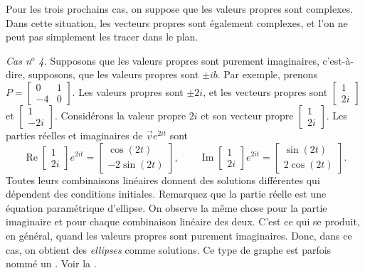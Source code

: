\medskip

\pagebreak[0]
Pour les trois prochains cas, on suppose que les valeurs propres sont complexes. Dans cette situation, les vecteurs propres sont également complexes, et l'on ne peut pas simplement les tracer dans le plan.

\medskip

\pagebreak[0]
\emph{Cas n$^o$ 4.} Supposons que les valeurs propres sont purement imaginaires, c'est-à-dire, supposons, que les valeurs propres sont $\pm ib$. Par exemple, prenons $P = 
\left[ \begin{smallmatrix} 0 & 1 \\ -4 & 0 \end{smallmatrix} \right]$.
Les valeurs propres sont $\pm 2i$, et les vecteurs propres sont
$\left[ \begin{smallmatrix} 1 \\ 2i \end{smallmatrix} \right]$ et
$\left[ \begin{smallmatrix} 1 \\ -2i \end{smallmatrix} \right]$. Considérons la valeur propre $2i$ et son vecteur propre
$\left[ \begin{smallmatrix} 1 \\ 2i \end{smallmatrix} \right]$.
Les parties réelles et imaginaires de $\vec{v} e^{2it}$ sont
\begin{equation*}
\operatorname{Re}
\begin{bmatrix} 1 \\ 2i \end{bmatrix} e^{2it} =
\begin{bmatrix} \cos (2t) \\ -2 \sin (2t) \end{bmatrix} ,
\qquad
\operatorname{Im}
\begin{bmatrix} 1 \\ 2i \end{bmatrix} e^{2it} =
\begin{bmatrix} \sin (2t) \\ 2 \cos (2t) \end{bmatrix} .
\end{equation*}
Toutes leurs combinaisons linéaires donnent des solutions différentes qui dépendent des conditions initiales. Remarquez que la partie réelle est une équation paramétrique d'ellipse. On observe la même chose pour la partie imaginaire et pour chaque combinaison linéaire des deux. C'est ce qui se produit, en général, quand les valeurs propres sont purement imaginaires. Donc, dans ce cas, on obtient des \emph{ellipses} comme solutions. Ce type de graphe est parfois nommé un \emph{}. Voir la .

